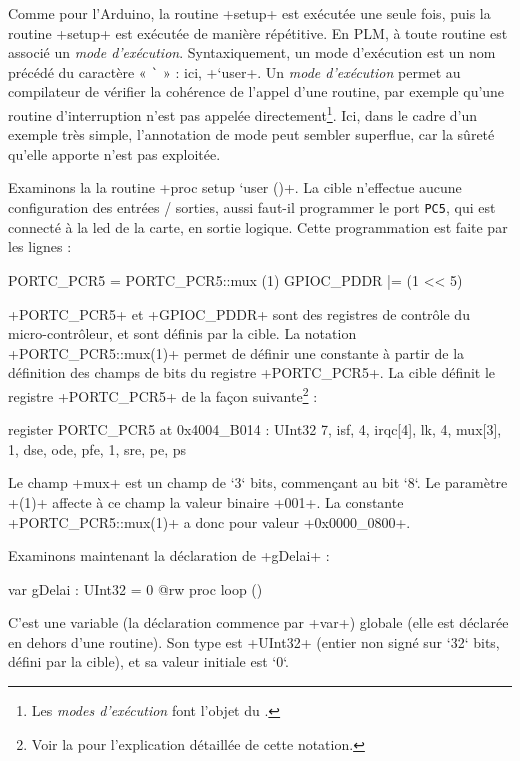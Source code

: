 Comme pour l'Arduino, la routine \plm+setup+ est exécutée une seule fois, puis la routine \plm+setup+ est exécutée de manière répétitive. En PLM, à toute routine est associé un \emph{mode d'exécution}. Syntaxiquement, un mode d'exécution est un nom précédé du caractère « \texttt{\`} » : ici, \plm+`user+. Un \emph{mode d'exécution} permet au compilateur de vérifier la cohérence de l'appel d'une routine, par exemple qu'une routine d'interruption n'est pas appelée directement\footnote{Les \emph{modes d'exécution} font l'objet du .}. Ici, dans le cadre d'un exemple très simple, l'annotation de mode peut sembler superflue, car la sûreté qu'elle apporte n'est pas exploitée. 


Examinons la la routine \plm+proc setup `user ()+. La cible n'effectue aucune configuration des entrées / sorties, aussi faut-il programmer le port \texttt{PC5}, qui est connecté à la led de la carte, en sortie logique. Cette programmation est faite par les lignes :

\begin{PLM}[4]
  PORTC_PCR5 = PORTC_PCR5::mux (1)
  GPIOC_PDDR |= (1 << 5)
\end{PLM}

\plm+PORTC_PCR5+ et \plm+GPIOC_PDDR+ sont des registres de contrôle du micro-contrôleur, et sont définis par la cible. La notation \plm+PORTC_PCR5::mux(1)+ permet de définir une constante à partir de la définition des champs de bits du registre \plm+PORTC_PCR5+. La cible définit le registre \plm+PORTC_PCR5+ de la façon suivante\footnote{Voir la  pour l'explication détaillée de cette notation.} :

\begin{PLM}[0]
register PORTC_PCR5 at 0x4004_B014 : UInt32 {
  7, isf, 4, irqc[4], lk, 4, mux[3], 1, dse, ode, pfe, 1, sre, pe, ps
}
\end{PLM}

Le champ \plm+mux+ est un champ de `3` bits, commençant au bit `8`. Le paramètre \plm+(1)+ affecte à ce champ la valeur binaire \plm+001+. La constante \plm+PORTC_PCR5::mux(1)+ a donc pour valeur \plm+0x0000_0800+.

Examinons maintenant la déclaration de \plm+gDelai+ :
\begin{PLM}[8]
var gDelai : UInt32 = 0 {
  @rw proc loop ()
}
\end{PLM}

C'est une variable (la déclaration commence par \plm+var+) globale (elle est déclarée en dehors d'une routine). Son type est \plm+UInt32+ (entier non signé sur `32` bits, défini par la cible), et sa valeur initiale est `0`.

